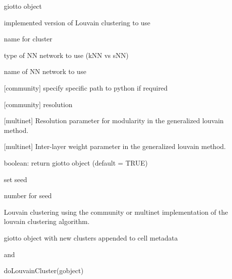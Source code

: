 \documentclass[a4paper]{book}
\begin{document}
\begin{Arguments}
\begin{ldescription}
\item[\code{gobject}] giotto object

\item[\code{version}] implemented version of Louvain clustering to use

\item[\code{name}] name for cluster

\item[\code{nn\_network\_to\_use}] type of NN network to use (kNN vs sNN)

\item[\code{network\_name}] name of NN network to use

\item[\code{python\_path}] [community] specify specific path to python if required

\item[\code{resolution}] [community] resolution

\item[\code{gamma}] [multinet] Resolution parameter for modularity in the generalized louvain method.

\item[\code{omega}] [multinet] Inter-layer weight parameter in the generalized louvain method.

\item[\code{return\_gobject}] boolean: return giotto object (default = TRUE)

\item[\code{set\_seed}] set seed

\item[\code{seed\_number}] number for seed
\end{ldescription}
\end{Arguments}
%
\begin{Details}\relax
Louvain clustering using the community or multinet implementation of the louvain clustering algorithm.
\end{Details}
%
\begin{Value}
giotto object with new clusters appended to cell metadata
\end{Value}
%
\begin{SeeAlso}\relax
{} and 
\end{SeeAlso}
%
\begin{Examples}
\begin{ExampleCode}
    doLouvainCluster(gobject)
\end{ExampleCode}
\end{Examples}
\end{document}
